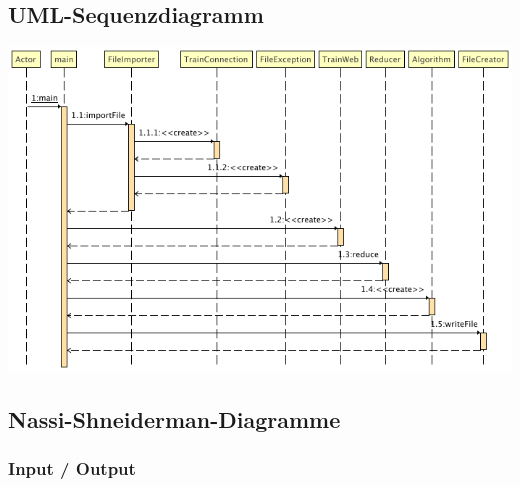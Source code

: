 \subsection{UML-Sequenzdiagramm}\label{pro:subsec:uml-sequenzdiagramm}
\begin{center}
    \includegraphics[width=\linewidth]{images/Struktogramme/Sequenzdiagramm.png}
    \label{pro:subsecpar:uml-sequenzdiagramm}
\end{center}

\newpage
\subsection{Nassi-Shneiderman-Diagramme}\label{pro:subsec:nassi-shneiderman-diagramme}
\subsubsection{Input / Output}\label{pro:subsubsec:io}
